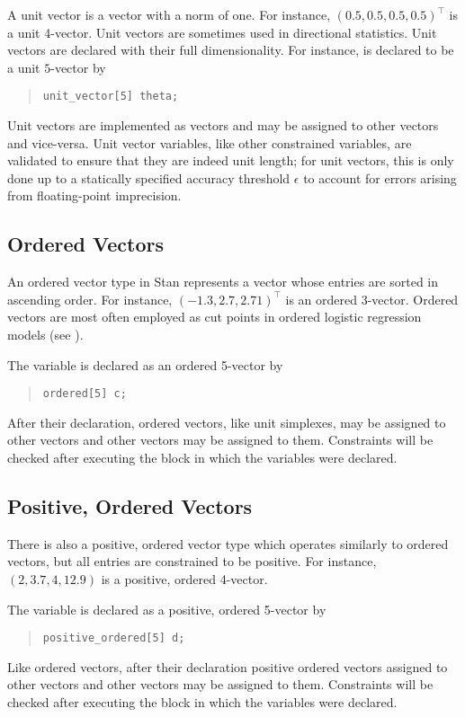 A unit vector is a vector with a norm of one.  For instance,
$(0.5,0.5,0.5,0.5)^{\top}$ is a unit 4-vector.
Unit vectors are sometimes used in directional statistics.
Unit vectors are declared with their full
dimensionality.  For instance,  is declared to
be a unit $5$-vector by
%
\begin{quote}
\begin{Verbatim} 
unit_vector[5] theta;
\end{Verbatim}
\end{quote}
% 
Unit vectors are implemented as vectors and may be assigned to other
vectors and vice-versa.  Unit vector variables, like other constrained
variables, are validated to ensure that they are indeed unit length; for
unit vectors, this is only done up to a statically specified accuracy
threshold $\epsilon$ to account for errors arising from floating-point
imprecision.

\subsection{Ordered Vectors}

An ordered vector type in Stan represents a vector whose entries are
sorted in ascending order.  For instance, $(-1.3,2.7,2.71)^{\top}$ is
an ordered 3-vector.  Ordered vectors are most often employed as cut
points in ordered logistic regression models (see
).

The variable  is declared as an ordered 5-vector by
%
\begin{quote}
\begin{Verbatim}
ordered[5] c;
\end{Verbatim}
\end{quote}
%
After their declaration, ordered vectors, like unit simplexes, may be 
assigned to other vectors and other vectors may be assigned to them. 
Constraints will be checked after executing the block in which the 
variables were declared.  


\subsection{Positive, Ordered Vectors}

There is also a positive, ordered vector type which operates similarly
to ordered vectors, but all entries are constrained to be positive.
For instance, $(2,3.7,4,12.9)$ is a positive, ordered 4-vector.

The variable  is declared as a positive, ordered 5-vector by
%
\begin{quote}
\begin{Verbatim}
positive_ordered[5] d;
\end{Verbatim}
\end{quote}
%
Like ordered vectors, after their declaration positive ordered vectors
assigned to other vectors and other vectors may be assigned to them. 
Constraints will be checked after executing the block in which the 
variables were declared.  


